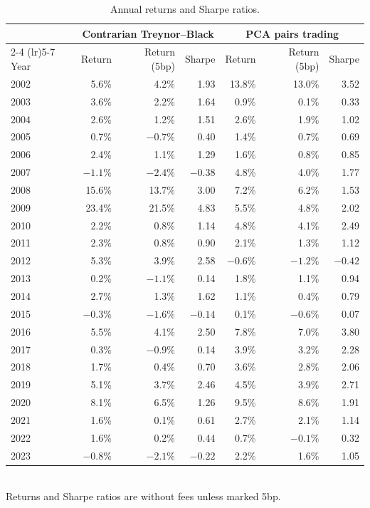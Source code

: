 \documentclass[12pt,letterpaper]{article}
\begin{document}
\begin{table}[H]
\centering
\caption{Annual returns and Sharpe ratios.}
\label{tab:yearly}
\begin{tabular}{lrrrrrr}
\toprule
& \multicolumn{3}{c}{Contrarian Treynor--Black} & \multicolumn{3}{c}{PCA pairs trading} \\
\cmidrule(lr){2-4} \cmidrule(lr){5-7}
Year & Return & Return (5bp) & Sharpe & Return & Return (5bp) & Sharpe \\
\midrule
2002 & 5.6\% & 4.2\% & 1.93 & 13.8\% & 13.0\% & 3.52 \\
2003 & 3.6\% & 2.2\% & 1.64 & 0.9\% & 0.1\% & 0.33 \\
2004 & 2.6\% & 1.2\% & 1.51 & 2.6\% & 1.9\% & 1.02 \\
2005 & 0.7\% & $-0.7\%$ & 0.40 & 1.4\% & 0.7\% & 0.69 \\
2006 & 2.4\% & 1.1\% & 1.29 & 1.6\% & 0.8\% & 0.85 \\
2007 & $-1.1\%$ & $-2.4\%$ & $-0.38$ & 4.8\% & 4.0\% & 1.77 \\
2008 & 15.6\% & 13.7\% & 3.00 & 7.2\% & 6.2\% & 1.53 \\
2009 & 23.4\% & 21.5\% & 4.83 & 5.5\% & 4.8\% & 2.02 \\
2010 & 2.2\% & 0.8\% & 1.14 & 4.8\% & 4.1\% & 2.49 \\
2011 & 2.3\% & 0.8\% & 0.90 & 2.1\% & 1.3\% & 1.12 \\
2012 & 5.3\% & 3.9\% & 2.58 & $-0.6\%$ & $-1.2\%$ & $-0.42$ \\
2013 & 0.2\% & $-1.1\%$ & 0.14 & 1.8\% & 1.1\% & 0.94 \\
2014 & 2.7\% & 1.3\% & 1.62 & 1.1\% & 0.4\% & 0.79 \\
2015 & $-0.3\%$ & $-1.6\%$ & $-0.14$ & 0.1\% & $-0.6\%$ & 0.07 \\
2016 & 5.5\% & 4.1\% & 2.50 & 7.8\% & 7.0\% & 3.80 \\
2017 & 0.3\% & $-0.9\%$ & 0.14 & 3.9\% & 3.2\% & 2.28 \\
2018 & 1.7\% & 0.4\% & 0.70 & 3.6\% & 2.8\% & 2.06 \\
2019 & 5.1\% & 3.7\% & 2.46 & 4.5\% & 3.9\% & 2.71 \\
2020 & 8.1\% & 6.5\% & 1.26 & 9.5\% & 8.6\% & 1.91 \\
2021 & 1.6\% & 0.1\% & 0.61 & 2.7\% & 2.1\% & 1.14 \\
2022 & 1.6\% & 0.2\% & 0.44 & 0.7\% & $-0.1\%$ & 0.32 \\
2023 & $-0.8\%$ & $-2.1\%$ & $-0.22$ & 2.2\% & 1.6\% & 1.05 \\
\bottomrule
\end{tabular}
\\[4pt]
\small Returns and Sharpe ratios are without fees unless marked 5bp.
\end{table}
\end{document}
